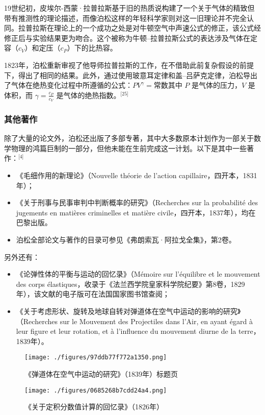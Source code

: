 19世纪初，皮埃尔-西蒙·拉普拉斯基于旧的热质说构建了一个关于气体的精致但带有推测性的理论描述，而像泊松这样的年轻科学家则对这一旧理论并不完全认同。拉普拉斯在理论上的一个成功之处是对牛顿空气中声速公式的修正，该公式经修正后与实验结果更为吻合。这个被称为牛顿–拉普拉斯公式的表达涉及气体在定容（$c_V$）和定压（$c_P$）下的比热容。

1823年，泊松重新审视了他导师拉普拉斯的工作，在不借助此前复杂假设的前提下，得出了相同的结果。此外，通过使用玻意耳定律和盖–吕萨克定律，泊松导出了气体在绝热变化过程中所遵循的公式：$PV^\gamma = \text{常数}$其中 $P$ 是气体的压力，$V$ 是体积，而 $\gamma = \frac{c_P}{c_V}$ 是气体的绝热指数。\(^\text{[25]}\)
\subsubsection{其他著作}
除了大量的论文外，泊松还出版了多部专著，其中大多数原本计划作为一部关于数学物理的鸿篇巨制的一部分，但他未能在生前完成这一计划。以下是其中一些著作：\(^\text{[4]}\)
\begin{itemize}
\item 《毛细作用的新理论》（Nouvelle théorie de l'action capillaire，四开本，1831年）；
\item 《关于刑事与民事审判中判断概率的研究》（Recherches sur la probabilité des jugements en matières criminelles et matière civile，四开本，1837年），均在巴黎出版。
\item 泊松全部论文与著作的目录可参见《弗朗索瓦·阿拉戈全集》，第2卷。
\end{itemize}
另外还有：
\begin{itemize}
\item 《论弹性体的平衡与运动的回忆录》（Mémoire sur l'équilibre et le mouvement des corps élastiques，收录于《法兰西学院皇家科学院纪要》第8卷，1829年），该文献的电子版可在法国国家图书馆查阅；
\item 《关于考虑形状、旋转及地球自转对弹道体在空气中运动的影响的研究》（Recherches sur le Mouvement des Projectiles dans l'Air, en ayant égard à leur figure et leur rotation, et à l'influence du mouvement diurne de la terre，1839年）。
\end{itemize}
\begin{figure}[ht]
\centering
\texttt{[image: ./figures/97ddb77f772a1350.png]}
\caption{《弹道体在空气中运动的研究》（1839年）标题页} \label{fig_BSDN_4}
\end{figure}
\begin{figure}[ht]
\centering
\texttt{[image: ./figures/0685268b7cdd24a4.png]}
\caption{《关于定积分数值计算的回忆录》（1826年）} \label{fig_BSDN_5}
\end{figure}
